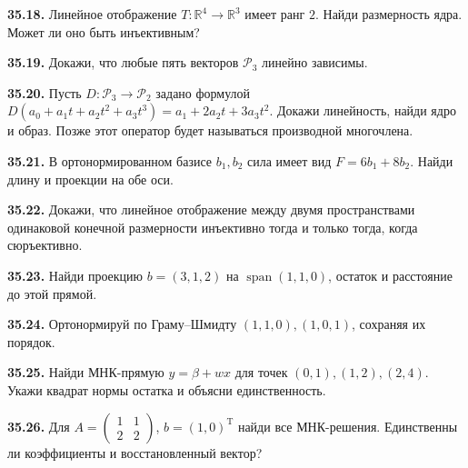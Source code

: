 \noindent\begin{minipage}[t]{\linewidth}\textbf{35.18.} Линейное отображение \(T:\mathbb R^4\to\mathbb R^3\) имеет ранг \(2\). Найди размерность ядра. Может ли оно быть инъективным?\par\end{minipage}\par
\noindent\begin{minipage}[t]{\linewidth}\textbf{35.19.}\starmark{} Докажи, что любые пять векторов \(\mathcal P_3\) линейно зависимы.\par\end{minipage}\par
\noindent\begin{minipage}[t]{\linewidth}\textbf{35.20.}\starmark{} Пусть \(D:\mathcal P_3\to\mathcal P_2\) задано формулой \(D(a_0+a_1t+a_2t^2+a_3t^3)=a_1+2a_2t+3a_3t^2\). Докажи линейность, найди ядро и образ. Позже этот оператор будет называться производной многочлена.\par\end{minipage}\par
\noindent\begin{minipage}[t]{\linewidth}\textbf{35.21.} В ортонормированном базисе \(b_1,b_2\) сила имеет вид \(F=6b_1+8b_2\). Найди длину и проекции на обе оси.\par\end{minipage}\par
\noindent\begin{minipage}[t]{\linewidth}\textbf{35.22.}\starmark{} Докажи, что линейное отображение между двумя пространствами одинаковой конечной размерности инъективно тогда и только тогда, когда сюръективно.\par\end{minipage}\par
\noindent\begin{minipage}[t]{\linewidth}\textbf{35.23.} Найди проекцию \(b=(3,1,2)\) на \(\operatorname{span}(1,1,0)\), остаток и расстояние до этой прямой.\par\end{minipage}\par
\noindent\begin{minipage}[t]{\linewidth}\textbf{35.24.} Ортонормируй по Граму--Шмидту \((1,1,0),(1,0,1)\), сохраняя их порядок.\par\end{minipage}\par
\noindent\begin{minipage}[t]{\linewidth}\textbf{35.25.} Найди МНК-прямую \(y=\beta+wx\) для точек \((0,1),(1,2),(2,4)\). Укажи квадрат нормы остатка и объясни единственность.\par\end{minipage}\par
\noindent\begin{minipage}[t]{\linewidth}\textbf{35.26.}\starmark{} Для \(A=\begin{pmatrix}1&1\\2&2\end{pmatrix}\), \(b=(1,0)^{\mathrm T}\) найди все МНК-решения. Единственны ли коэффициенты и восстановленный вектор?\par\end{minipage}\par
\endgroup
